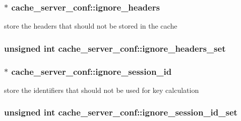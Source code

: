 \subsubsection[{\texorpdfstring{ignore\+\_\+headers}{ignore_headers}}]{$\ast$ cache\+\_\+server\+\_\+conf\+::ignore\+\_\+headers}\hypertarget{structcache__server__conf_a4e8983b6a8e6aa3777b6c49844d75faa}{}\label{structcache__server__conf_a4e8983b6a8e6aa3777b6c49844d75faa}
store the headers that should not be stored in the cache 
\subsubsection[{\texorpdfstring{ignore\+\_\+headers\+\_\+set}{ignore_headers_set}}]{\setlength{\rightskip}{0pt plus 5cm}unsigned {\bf int} cache\+\_\+server\+\_\+conf\+::ignore\+\_\+headers\+\_\+set}\hypertarget{structcache__server__conf_a3ae89cadf2e8546e91861ec37630e6bd}{}\label{structcache__server__conf_a3ae89cadf2e8546e91861ec37630e6bd}
\subsubsection[{\texorpdfstring{ignore\+\_\+session\+\_\+id}{ignore_session_id}}]{$\ast$ cache\+\_\+server\+\_\+conf\+::ignore\+\_\+session\+\_\+id}\hypertarget{structcache__server__conf_a71f98f488db59936317ef657edfe8653}{}\label{structcache__server__conf_a71f98f488db59936317ef657edfe8653}
store the identifiers that should not be used for key calculation 
\subsubsection[{\texorpdfstring{ignore\+\_\+session\+\_\+id\+\_\+set}{ignore_session_id_set}}]{\setlength{\rightskip}{0pt plus 5cm}unsigned {\bf int} cache\+\_\+server\+\_\+conf\+::ignore\+\_\+session\+\_\+id\+\_\+set}\hypertarget{structcache__server__conf_a2699aeb355ccaf020c56b742066c5505}{}\label{structcache__server__conf_a2699aeb355ccaf020c56b742066c5505}
